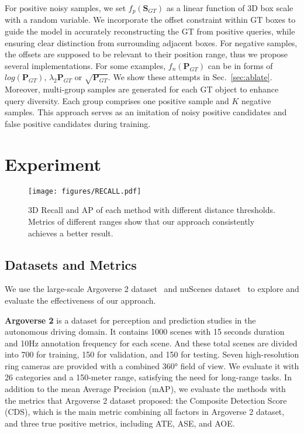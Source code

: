 \documentclass[letterpaper]{article} \usepackage{aaai24}
\begin{document}
For positive noisy samples, we set $f_{p}(\mathbf{S}_{GT})$ as a linear function of 3D box scale with a random variable. 
We incorporate the offset constraint within GT boxes to guide the model in accurately reconstructing the GT from positive queries, while ensuring clear distinction from surrounding adjacent boxes.
For negative samples, the offsets are supposed to be relevant to their position range, thus we propose several implementations. For some examples, $f_{n}(\mathbf{P}_{GT})$ can be in forms of $log(\mathbf{P}_{GT})$, $\lambda_2 \mathbf{P}_{GT}$ or $\sqrt{\mathbf{P}_{GT}}$. We show these attempts in Sec.~\ref{sec:ablate}. 
Moreover, multi-group samples are generated for each GT object to enhance query diversity. Each group comprises one positive sample and $K$ negative samples. This approach serves as an imitation of noisy positive candidates and false positive candidates during training.







 \section{Experiment}

\begin{figure*}[t!]
\centering
\texttt{[image: figures/RECALL.pdf]}
\caption{3D Recall and AP of each method with different distance thresholds. Metrics of different ranges show that our approach consistently achieves a better result.}
\label{recall_ap}
\vspace{-0.3cm}
\end{figure*}

\subsection{Datasets and Metrics}
We use the large-scale Argoverse 2 dataset~\cite{wilson2023argoverse} and nuScenes dataset~\cite{caesar2020nuscenes} to explore and evaluate the effectiveness of our approach.

\textbf{Argoverse 2} is a dataset for perception and prediction studies in the autonomous driving domain. It contains 1000 scenes with 15 seconds duration and 10Hz annotation frequency for each scene. And these total scenes are divided into 700 for training, 150 for validation, and 150 for testing. Seven high-resolution ring cameras are provided with a combined 360° field of view. 
We evaluate it with 26 categories and a 150-meter range, satisfying the need for long-range tasks.
In addition to the mean Average Precision (mAP), we evaluate the methods with the metrics that Argoverse 2 dataset proposed: the Composite Detection Score (CDS), which is the main metric combining all factors in Argoverse 2 dataset, and three true positive metrics, including ATE, ASE, and AOE.
\end{document}

